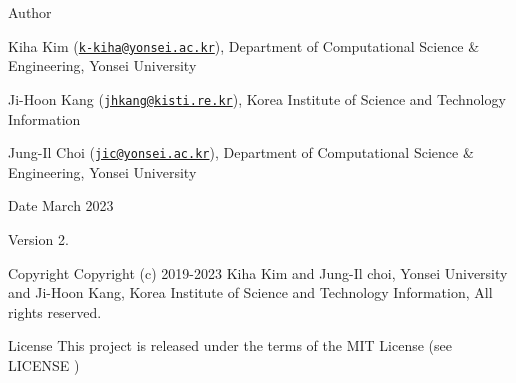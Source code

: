 \begin{DoxyAuthor}{Author}

\begin{DoxyItemize}
\item Kiha Kim (\href{mailto:k-kiha@yonsei.ac.kr}{\tt k-\/kiha@yonsei.\+ac.\+kr}), Department of Computational Science \& Engineering, Yonsei University
\item Ji-\/\+Hoon Kang (\href{mailto:jhkang@kisti.re.kr}{\tt jhkang@kisti.\+re.\+kr}), Korea Institute of Science and Technology Information
\item Jung-\/\+Il Choi (\href{mailto:jic@yonsei.ac.kr}{\tt jic@yonsei.\+ac.\+kr}), Department of Computational Science \& Engineering, Yonsei University
\end{DoxyItemize}
\end{DoxyAuthor}
\begin{DoxyDate}{Date}
March 2023 
\end{DoxyDate}
\begin{DoxyVersion}{Version}
2. 
\end{DoxyVersion}
\begin{DoxyParagraph}{Copyright}
Copyright (c) 2019-\/2023 Kiha Kim and Jung-\/\+Il choi, Yonsei University and Ji-\/\+Hoon Kang, Korea Institute of Science and Technology Information, All rights reserved. 
\end{DoxyParagraph}
\begin{DoxyParagraph}{License }
This project is released under the terms of the M\+IT License (see L\+I\+C\+E\+N\+SE ) 
\end{DoxyParagraph}

